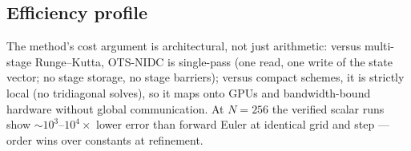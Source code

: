 \subsection{Efficiency profile}

The method's cost argument is architectural, not just arithmetic: versus
multi-stage Runge--Kutta, OTS-NIDC is single-pass (one read, one write of the
state vector; no stage storage, no stage barriers); versus compact schemes, it
is strictly local (no tridiagonal solves), so it maps onto GPUs and
bandwidth-bound hardware without global communication. At $N=256$ the verified
scalar runs show $\sim10^3$--$10^4\times$ lower error than forward Euler at
identical grid and step \tagV --- order wins over constants at refinement.
